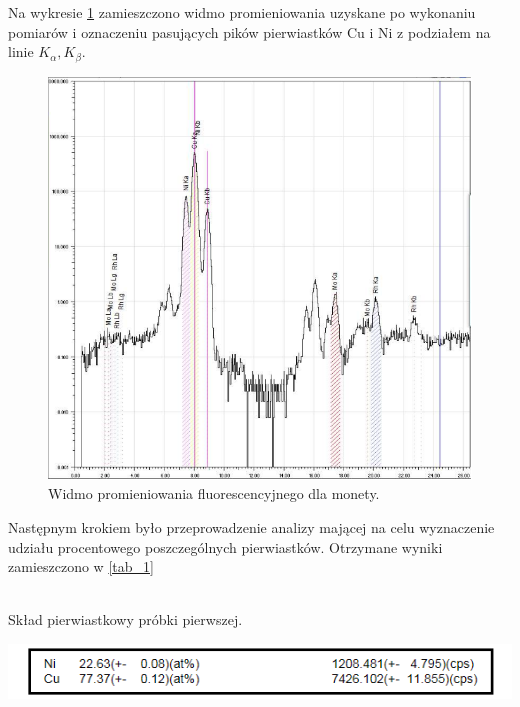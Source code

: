 \documentclass[11pt]{article}
\begin{document}
Na wykresie \ref{wykres_1} zamieszczono widmo promieniowania uzyskane po wykonaniu pomiarów i oznaczeniu pasujących pików pierwiastków Cu i Ni z podziałem na linie $K_{\alpha}, K_{\beta}$.\\

\begin{figure}[h!] %
\begin{center}
\includegraphics[scale=0.6]{moneta1.png}
\caption{Widmo promieniowania fluorescencyjnego dla monety.}
\label{wykres_1}
\end{center}
\end{figure}

Następnym krokiem było przeprowadzenie analizy mającej na celu wyznaczenie udziału procentowego poszczególnych pierwiastków. 
Otrzymane wyniki zamieszczono w \ref{tab_1}\\
\\	
\begin{table}[h!]
\begin{center}
\caption{Skład pierwiastkowy próbki pierwszej.}\label{tab_1}
\includegraphics[scale=0.8]{moneta_il.png}\\
\end{center}
\end{table}
\end{document}
